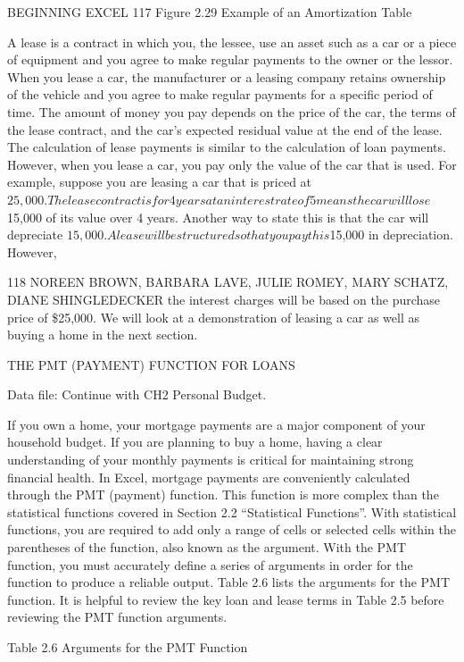 BEGINNING EXCEL 117
Figure 2.29 Example of an Amortization Table


A lease is a contract in which you, the lessee, use an asset such as a car or a piece of equipment and you
agree to make regular payments to the owner or the lessor. When you lease a car, the manufacturer
or a leasing company retains ownership of the vehicle and you agree to make regular payments for a
specific period of time. The amount of money you pay depends on the price of the car, the terms of
the lease contract, and the car’s expected residual value at the end of the lease. The calculation of lease
payments is similar to the calculation of loan payments. However, when you lease a car, you pay only
the value of the car that is used. For example, suppose you are leasing a car that is priced at $25,000.
The lease contract is for 4 years at an interest rate of 5%
means the car will lose $15,000 of its value over 4 years. Another way to state this is that the car will
depreciate $15,000. A lease will be structured so that you pay this $15,000 in depreciation. However,

118 NOREEN BROWN, BARBARA LAVE, JULIE ROMEY, MARY SCHATZ, DIANE SHINGLEDECKER
the interest charges will be based on the purchase price of \$25,000. We will look at a demonstration
of leasing a car as well as buying a home in the next section.

THE PMT (PAYMENT) FUNCTION FOR LOANS

Data file: Continue with CH2 Personal Budget.

If you own a home, your mortgage payments are a major component of your household budget. If you
are planning to buy a home, having a clear understanding of your monthly payments is critical for
maintaining strong financial health. In Excel, mortgage payments are conveniently calculated through
the PMT (payment) function. This function is more complex than the statistical functions covered in
Section 2.2 “Statistical Functions”. With statistical functions, you are required to add only a range of
cells or selected cells within the parentheses of the function, also known as the argument. With the
PMT function, you must accurately define a series of arguments in order for the function to produce
a reliable output. Table 2.6 lists the arguments for the PMT function. It is helpful to review the key
loan and lease terms in Table 2.5 before reviewing the PMT function arguments.

Table 2.6 Arguments for the PMT Function

